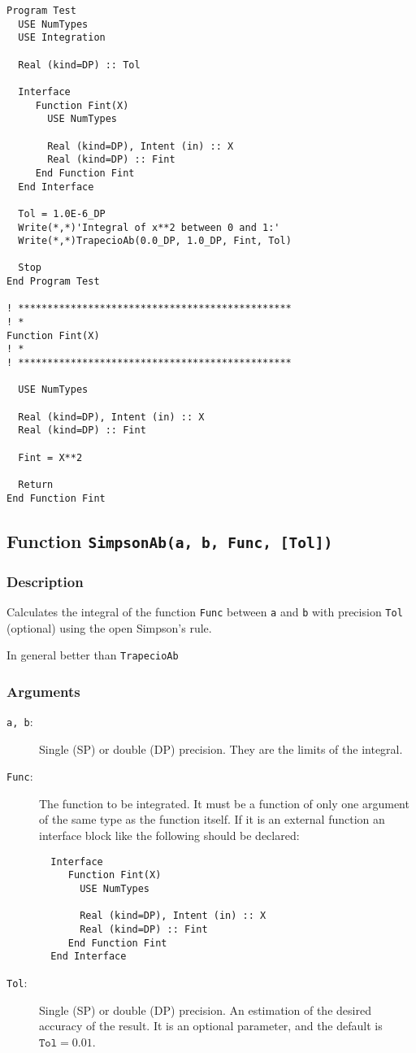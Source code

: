 \begin{verbatim}
Program Test
  USE NumTypes
  USE Integration

  Real (kind=DP) :: Tol

  Interface 
     Function Fint(X)
       USE NumTypes

       Real (kind=DP), Intent (in) :: X
       Real (kind=DP) :: Fint
     End Function Fint
  End Interface

  Tol = 1.0E-6_DP
  Write(*,*)'Integral of x**2 between 0 and 1:'
  Write(*,*)TrapecioAb(0.0_DP, 1.0_DP, Fint, Tol)

  Stop
End Program Test

! ***********************************************
! *
Function Fint(X)
! *  
! ***********************************************

  USE NumTypes

  Real (kind=DP), Intent (in) :: X
  Real (kind=DP) :: Fint

  Fint = X**2

  Return
End Function Fint
\end{verbatim}


\subsection{Function \texttt{SimpsonAb(a, b, Func, [Tol])}}

\subsubsection{Description}

Calculates the integral of the function \texttt{Func} between
\texttt{a} and \texttt{b} with precision \texttt{Tol} (optional) using
the open Simpson's rule.

In general better than \texttt{TrapecioAb}

\subsubsection{Arguments}

\begin{description}
\item[\texttt{a, b}:] Single (SP) or double (DP) precision. They are
  the limits of the integral.
\item[\texttt{Func}:] The function to be integrated. It must be a
  function of only one argument of the same type as the function
  itself. If it is an
  external function an interface block like the following should be
  declared: 
\begin{verbatim}
  Interface 
     Function Fint(X)
       USE NumTypes

       Real (kind=DP), Intent (in) :: X
       Real (kind=DP) :: Fint
     End Function Fint
  End Interface
\end{verbatim}
\item[\texttt{Tol}:] Single (SP) or double (DP) precision. An
  estimation of the desired accuracy of the result. It is an optional
  parameter, and the default is $\mathtt{Tol} = 0.01$. 
\end{description}


